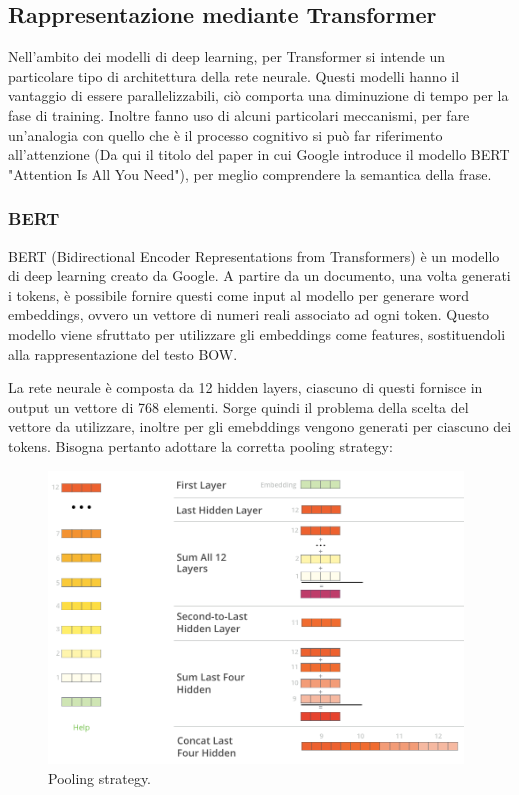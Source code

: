 \documentclass[oneside]{book}
\begin{document}
\subsection{Rappresentazione mediante Transformer}
Nell'ambito dei modelli di deep learning, per Transformer si intende un particolare tipo di architettura della rete neurale. Questi modelli hanno il vantaggio di essere parallelizzabili, ciò comporta una diminuzione di tempo per la fase di training. Inoltre fanno uso di alcuni particolari meccanismi, per fare un'analogia con quello che è il processo cognitivo si può far riferimento all'attenzione (Da qui il titolo del paper in cui Google introduce il modello BERT "Attention Is All You Need"\cite{bert}), per meglio comprendere la semantica della frase\cite{transformer}.

\subsubsection{BERT}
BERT (Bidirectional Encoder Representations from Transformers) è un modello di deep learning creato da Google. A partire da un documento, una volta generati i tokens, è possibile fornire questi come input al modello per generare word embeddings, ovvero un vettore di numeri reali associato ad ogni token. Questo modello viene sfruttato per utilizzare gli embeddings come features, sostituendoli alla rappresentazione del testo BOW.

La rete neurale è composta da 12 hidden layers, ciascuno di questi fornisce in output un vettore di 768 elementi. Sorge quindi il problema della scelta del vettore da utilizzare, inoltre per gli emebddings vengono generati per ciascuno dei tokens. Bisogna pertanto adottare la corretta pooling strategy:

\begin{figure}[!h]
	\centering
	\includegraphics[width=11cm]{assets/pooling-strategy.png}
	\caption[Caption for LOF]{Pooling strategy. \footnotemark}
\end{figure}
\end{document}
